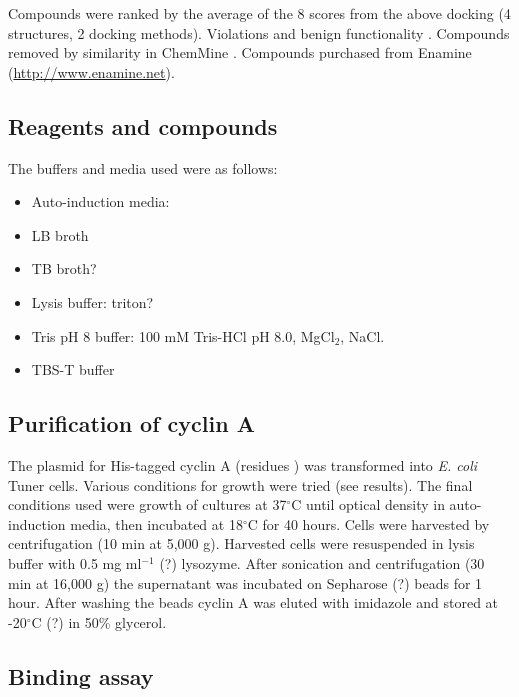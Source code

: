 Compounds were ranked by the average of the 8 scores from the above docking (4 structures, 2 docking methods).
Violations and benign functionality \cite{Daina2017}.
Compounds removed by similarity in ChemMine \cite{Backman2011}.
Compounds purchased from Enamine (\url{http://www.enamine.net}).


\subsection{Reagents and compounds}

The buffers and media used were as follows:
\begin{itemize}
\item Auto-induction media:
\item LB broth
\item TB broth?
\item Lysis buffer: triton?
\item Tris pH 8 buffer: 100 mM Tris-HCl pH 8.0, MgCl$_{2}$, NaCl.
\item TBS-T buffer
\end{itemize}


\subsection{Purification of cyclin A}

The plasmid for His-tagged cyclin A (residues ) was transformed into \textit{E. coli} Tuner cells.
Various conditions for growth were tried (see results).
The final conditions used were growth of cultures at 37$^{\circ}$C until optical density in auto-induction media, then incubated at 18$^{\circ}$C for 40 hours.
Cells were harvested by centrifugation (10 min at 5,000 g).
Harvested cells were resuspended in lysis buffer with 0.5 mg ml$^{-1}$ (?) lysozyme.
After sonication and centrifugation (30 min at 16,000 g) the supernatant was incubated on Sepharose (?) beads for 1 hour.
After washing the beads cyclin A was eluted with imidazole and stored at -20$^{\circ}$C (?) in 50\% glycerol.


\subsection{Binding assay}

